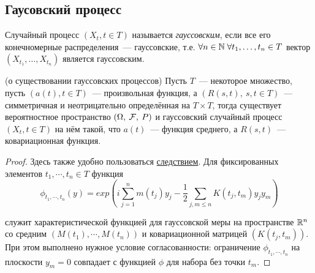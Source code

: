 \subsection{Гаусовский процесс}

\begin{definition} Случайный процесс $(X_t, t \in T)$ называется \textit{гауссовским}, если все его конечномерные распределения~---     гауссовские, т.е. $\forall n \in \mathbb{N} \; \forall t_1, \ldots, t_n \in T$ вектор $(X_{t_1}, \ldots, X_{t_n})$ является гауссовским.
\end{definition}

\begin{theorem}(о существовании гауссовских процессов)
    Пусть $T$~--- некоторое множество, пусть $(a(t), t \in T)$~--- произвольная функция, а $(R(s, t), \ s, t \in T)$~--- симметричная и неотрицательно определённая на $T\times T$, тогда существует вероятностное пространство $(\Omega,\: \mathcal{F},\: P)$ и гауссовский случайный процесс $(X_t, t \in T)$ на нём такой, что $a(t)$~--- функция среднего, а $R(s, t)$~--- ковариационная функция.
\end{theorem}

\begin{proof}
    Здесь также удобно пользоваться \hyperref[3.6.1]{следствием}. Для фиксированных элементов $t_1, \cdots, t_n \in T$ функция
    $$\phi_{t_1, \cdots, t_n}(y) = exp(i \sum\limits_{j=1}^{n} m(t_j) y_j - \frac{1}{2} \sum\limits_{j, m \leq n} K(t_j, t_m) y_j y_m)$$

    служит характеристической функцией для гауссовской меры на пространстве $\mathbb{R}^n$ со средним $(M(t_1), \cdots, M(t_n))$ и ковариационной матрицей $(K(t_j, t_m))$. При этом выполнено нужное условие согласованности: ограничение $\phi_{t_1, \cdots, t_n}$ на плоскости $y_m = 0$ совпадает с функцией $\phi$ для набора без точки $t_m$.
\end{proof}
